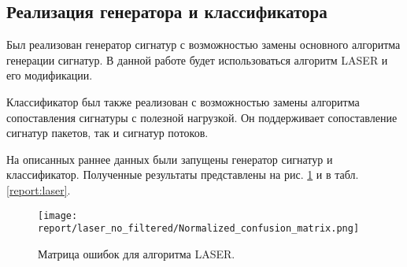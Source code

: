 \subsection{Реализация генератора и классификатора}

Был реализован генератор сигнатур с возможностью замены основного алгоритма генерации сигнатур.
В данной работе будет использоваться алгоритм LASER и его модификации.

Классификатор был также реализован с возможностью замены алгоритма сопоставления сигнатуры с полезной нагрузкой.
Он поддерживает сопоставление сигнатур пакетов, так и сигнатур потоков.

На описанных раннее данных были запущены генератор сигнатур и классификатор. Полученные результаты представлены на рис. \ref{matrix:laser} и в табл. \ref{report:laser}.

\begin{figure}[H]
    \begin{center}
        \texttt{[image: report/laser\_no\_filtered/Normalized\_confusion\_matrix.png]}
        \caption{Матрица ошибок для алгоритма LASER.}
        \label{matrix:laser}
    \end{center}
\end{figure}

\begin{table}[ht]
    \caption{Результаты классификации для алгоритма LASER.}
    \label{report:laser}
    \centering
\end{table}

